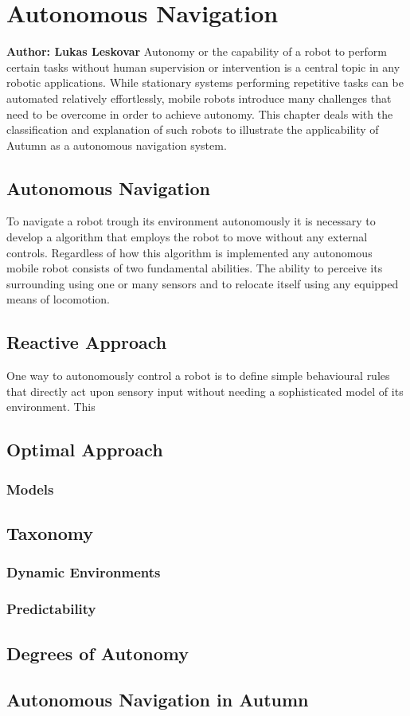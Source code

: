 \chapter{Autonomous Navigation}

\textbf{Author: Lukas Leskovar} 
Autonomy or the capability of a robot to perform certain tasks without human supervision or intervention is a central topic in any robotic applications.
While stationary systems performing repetitive tasks can be automated relatively effortlessly, mobile robots introduce many challenges that need to be overcome in order to achieve autonomy.
This chapter deals with the classification and explanation of such robots to illustrate the applicability of Autumn as a autonomous navigation system.

\section{Autonomous Navigation}
To navigate a robot trough its environment autonomously it is necessary to develop a algorithm that employs the robot to move without any external controls. Regardless of how this algorithm is implemented any autonomous mobile robot consists of two fundamental abilities. The ability to perceive its surrounding using one or many sensors and to relocate itself using any equipped means of locomotion. 

\section{Reactive Approach}
One way to autonomously control a robot is to define simple behavioural rules that directly act upon sensory input without needing a sophisticated model of its environment. 
This 

\section{Optimal Approach}

\subsection{Models}

\section{Taxonomy}

\subsection{Dynamic Environments}

\subsection{Predictability}

\section{Degrees of Autonomy}

\section{Autonomous Navigation in Autumn}


\filbreak